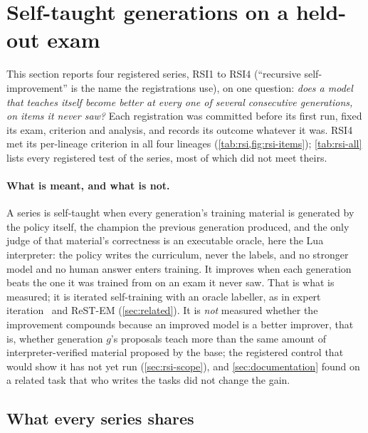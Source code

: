
\section{Self-taught generations on a held-out exam}\label{sec:rsi}

This section reports four registered series, RSI1 to RSI4 (``recursive self-improvement'' is the
name the registrations use), on one question: \emph{does a model that teaches itself become better at
every one of several consecutive generations, on items it never saw?} Each registration was committed
before its first run, fixed its exam, criterion and analysis, and records its outcome whatever it
was. RSI4 met its per-lineage criterion in all four lineages
(\cref{tab:rsi,fig:rsi-items}); \cref{tab:rsi-all} lists every registered test of the series, most of
which did not meet theirs.

\paragraph{What is meant, and what is not.} A series is self-taught when every
generation's training material is generated by the policy itself, the champion the previous generation
produced, and the only judge of that material's correctness is an executable oracle, here the Lua
interpreter: the policy writes the curriculum, never the labels, and no stronger model and no human
answer enters training. It improves when each generation beats the one it was trained from on an exam
it never saw. That is what is measured; it is iterated self-training with an oracle labeller, as in
expert iteration~\citep{exit2017} and ReST-EM (\cref{sec:related}). It is \emph{not}
measured whether the improvement compounds because an improved model is a better improver, that is,
whether generation $g$'s proposals teach more than the same amount of interpreter-verified material
proposed by the base; the registered control that would show it has not yet run (\cref{sec:rsi-scope}),
and \cref{sec:documentation} found on a related task that who writes the tasks did not change the
gain.

\subsection{What every series shares}\label{sec:rsi-design}

